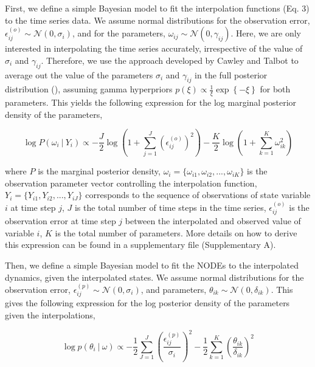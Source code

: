 \documentclass[11pt, oneside]{article}
\begin{document}
First, we define a simple Bayesian model to fit the interpolation functions (Eq. 3) to the time series data.
We assume normal distributions for the observation error, $\epsilon^{(o)}_{ij} \sim \mathcal{N}(0,\sigma_i)$, and for the parameters, $\omega_{ij} \sim \mathcal{N}(0,\gamma_{ij})$.
Here, we are only interested in interpolating the time series accurately, irrespective of the value of $\sigma_i$ and $\gamma_{ij}$.
Therefore, we use the approach developed by Cawley and Talbot to average out the value of the parameters $\sigma_i$ and $\gamma_{ij}$ in the full posterior distribution (\cite{Cawley2007}), assuming gamma hyperpriors $p(\xi) \propto \frac{1}{\xi} \exp\left\{- \xi \right\}$ for both parameters.
This yields the following expression for the log marginal posterior density of the parameters,

\vspace{-0.5cm}
\begin{equation}
    \log P(\omega_i ~|~ Y_i) \propto - \frac{J}{2} \log \left(1 + \sum_{j=1}^{J} \left( \epsilon^{(o)}_{ij} \right)^2 \right) - \frac{K}{2} \log \left(1 + \sum_{k=1}^{K} \omega_{ik}^2 \right)
\end{equation}

where $P$ is the marginal posterior density,
$\omega_i = \{\omega_{i1},\omega_{i2},...,\omega_{iK}\}$ is the observation parameter vector controlling the interpolation function,
$Y_i = \{Y_{i1},Y_{i2},...,Y_{iJ}\}$ corresponds to the sequence of observations of state variable $i$ at time step $j$, 
$J$ is the total number of time steps in the time series, 
$\epsilon^{(o)}_{ij}$ is the observation error at time step $j$ between the interpolated and observed  value of variable $i$, 
$K$ is the total number of parameters. 
More details on how to derive this expression can be found in a supplementary file (Supplementary A).

Then, we define a simple Bayesian model to fit the NODEs to the interpolated dynamics, given the interpolated states.
We assume normal distributions for the observation error, $\epsilon^{(p)}_{ij} \sim \mathcal{N}(0,\sigma_i)$, and parameters, $\theta_{ik} \sim \mathcal{N}(0,\delta_{ik})$.
This gives the following expression for the log posterior density of the parameters given the interpolations,

\vspace{-0.5cm}
\begin{equation}
    \log p(\theta_i ~|~ \omega) \propto - \frac{1}{2} \sum_{J=1}^{J} \left( \frac{\epsilon^{(p)}_{ij}}{\sigma_i} \right)^2 - \frac{1}{2} \sum_{k=1}^{K} \left( \frac{\theta_{ik}}{\delta_{ik}} \right)^2
\end{equation}
\end{document}
